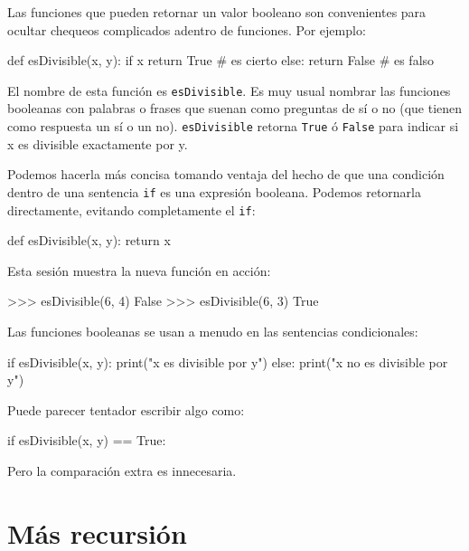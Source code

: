 \label{boolean}  

Las funciones que pueden retornar un valor booleano son convenientes
para ocultar chequeos complicados adentro de funciones. Por ejemplo:

\begin{pythoncode}
def esDivisible(x, y):
  if x %
    return True       #  es cierto
  else:
    return False      # es falso
\end{pythoncode}
 El nombre de esta función es \texttt{esDivisible}. Es muy usual nombrar
las funciones booleanas con palabras o frases que suenan como preguntas
de sí o no (que tienen como respuesta un sí o un no). \texttt{esDivisible}
retorna \texttt{True} ó \texttt{False} para indicar si x es divisible
exactamente por y.

Podemos hacerla más concisa tomando ventaja del hecho de que una condición
dentro de una sentencia \texttt{if} es una expresión booleana. Podemos
retornarla directamente, evitando completamente el \texttt{if}:

\begin{pythoncode}
def esDivisible(x, y):
  return x %
\end{pythoncode}
 Esta sesión muestra la nueva función en acción:

\begin{pyconcode}
>>>   esDivisible(6, 4)
False
>>>   esDivisible(6, 3)
True
\end{pyconcode}

Las funciones booleanas se usan a menudo en las sentencias condicionales:

\begin{pythoncode}
if esDivisible(x, y):
  print("x es divisible por y")
else:
  print("x no es divisible por y")
\end{pythoncode}
 Puede parecer tentador escribir algo como:

\begin{pythoncode}
if esDivisible(x, y) == True:
\end{pythoncode}
 Pero la comparación extra es innecesaria.

\section{Más recursión}

  
 

